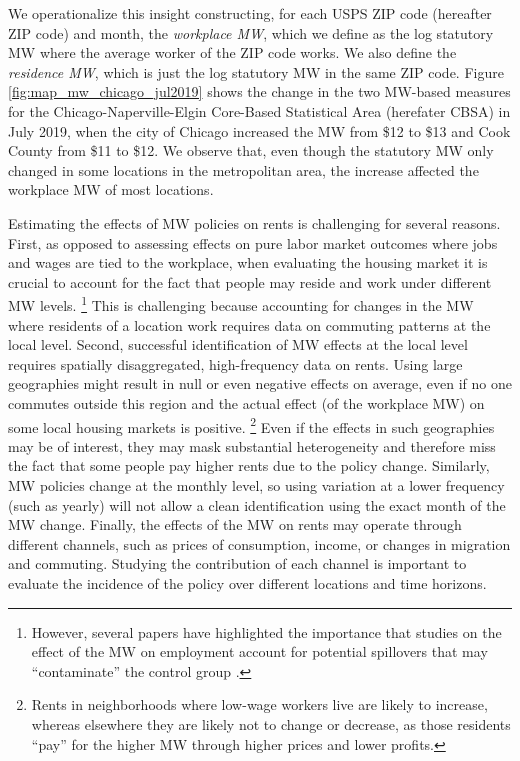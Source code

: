 We operationalize this insight constructing, for each USPS ZIP code (hereafter 
ZIP code) and month,
the \textit{workplace MW}, which we define as the log statutory MW where
the average worker of the ZIP code works.
We also define the \textit{residence MW}, which is just the log statutory MW in 
the same ZIP code.
Figure \ref{fig:map_mw_chicago_jul2019} shows the change in the two MW-based 
measures for the Chicago-Naperville-Elgin Core-Based Statistical Area 
(herefater CBSA) in July 2019, 
when the city of Chicago increased the MW from \$12 to \$13 and 
Cook County from \$11 to \$12.
We observe that, even though the statutory MW only changed in some locations in
the metropolitan area, the increase affected the workplace MW of most locations.


Estimating the effects of MW policies on rents is challenging for several 
reasons.
First, as opposed to assessing effects on pure labor market outcomes where jobs 
and wages are tied to the workplace, when evaluating the housing market it is 
crucial to account for the fact that people may reside and work under different 
MW levels.%
\footnote{However, several papers have highlighted the importance that studies
	on the effect of the MW on employment account for potential spillovers that 
	may ``contaminate'' the control group 
	\parencite{Kuehn2016, JardimEtAl2022discontinuity}.}
This is challenging because accounting for changes in the MW where residents
of a location work requires data on commuting patterns at the local level.
Second, successful identification of MW effects at the local level requires 
spatially disaggregated, high-frequency data on rents.
Using large geographies might result in null or even negative effects on 
average, even if no one commutes outside this region and the actual effect 
(of the workplace MW) on some local housing markets is positive.%
\footnote{Rents in neighborhoods where low-wage workers live are likely to 
	increase, whereas elsewhere they are likely not to change or decrease, 
	as those residents ``pay'' for the higher MW through higher prices and 
	lower profits.}
Even if the effects in such geographies may be of interest, they may mask 
substantial heterogeneity and therefore miss the fact that some people pay 
higher rents due to the policy change.
Similarly, MW policies change at the monthly level, so using variation at a 
lower frequency (such as yearly) will not allow a clean identification using 
the exact month of the MW change.
Finally, the effects of the MW on rents may operate through different channels,
such as prices of consumption, income, or changes in migration and commuting.
Studying the contribution of each channel is important to evaluate the 
incidence of the policy over different locations and time horizons.

